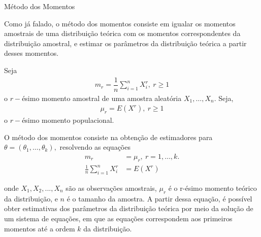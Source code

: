 \documentclass[12pt]{beamer}
\begin{document}
\begin{frame}{Método dos Momentos}
\vspace{-0.1cm}
\begin{block}{}
\justifying
Como já falado, o método dos momentos consiste em igualar os momentos amostrais de uma distribuição teórica com os momentos correspondentes da distribuição amostral, e estimar os parâmetros da distribuição teórica a partir desses momentos.
\end{block}
\pause
\vspace{-0.1cm}
\begin{block}{}
    Seja 
    \begin{align}
        m_{r}=\dfrac{1}{n}\displaystyle{\sum_{i=1}^{n}X_{i}^{r}},~r\geq 1
    \end{align}
o $r-$ésimo momento amostral de uma amostra aleatória $X_1, \dots, X_n.$ Seja, 
    \begin{align}
        \mu_{r}=E(X^{r}),~r\geq 1
    \end{align}
    o $r-$ésimo momento populacional.
\end{block}
\end{frame}

\begin{frame}{}
    \begin{block}{}
    \justifying
O método dos momentos consiste na obtenção de estimadores para $\theta=(\theta_{1}, \dots, \theta_{k}),$ resolvendo as equações 
\begin{align}
        m_{r}&=\mu_{r},~r=1,\dots,k.\\
        \frac{1}{n} \sum_{i=1}^{n} X_i^r &= E(X^{r})
    \end{align}


onde $X_1, X_2, ..., X_n$ são as observações amostrais, $\mu_r$ é o r-ésimo momento teórico da distribuição, e $n$ é o tamanho da amostra. A partir dessa equação, é possível obter estimativas dos parâmetros da distribuição teórica por meio da solução de um sistema de equações, em que as equações correspondem aos primeiros momentos até a ordem $k$ da distribuição.
\end{block}
\end{frame}
\end{document}
